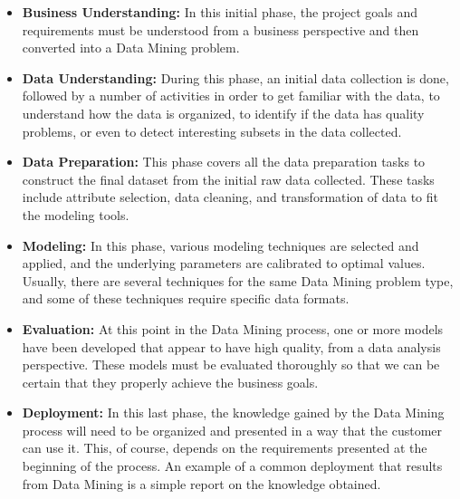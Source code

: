 \begin{itemize}

    \item\textbf{Business Understanding:} In this initial phase, the project goals and requirements must be understood from a business perspective and then converted into a Data Mining problem.

    \item\textbf{Data Understanding:} During this phase, an initial data collection is done, followed by a number of activities in order to get familiar with the data, to understand how the data is organized, to identify if the data has quality problems, or even to detect interesting subsets in the data collected.

    \item\textbf{Data Preparation:} This phase covers all the data preparation tasks to construct the final dataset from the initial raw data collected. These tasks include attribute selection, data cleaning, and transformation of data to fit the modeling tools.

    \item\textbf{Modeling:} In this phase, various modeling techniques are selected and applied, and the underlying parameters are calibrated to optimal values. Usually, there are several techniques for the same Data Mining problem type, and some of these techniques require specific data formats.

    \item\textbf{Evaluation:} At this point in the Data Mining process, one or more models have been developed that appear to have high quality, from a data analysis perspective. These models must be evaluated thoroughly so that we can be certain that they properly achieve the business goals.

    \item\textbf{Deployment:} In this last phase, the knowledge gained by the Data Mining process will need to be organized and presented in a way that the customer can use it. This, of course, depends on the requirements presented at the beginning of the process. An example of a common deployment that results from Data Mining is a simple report on the knowledge obtained. 

\end{itemize}

